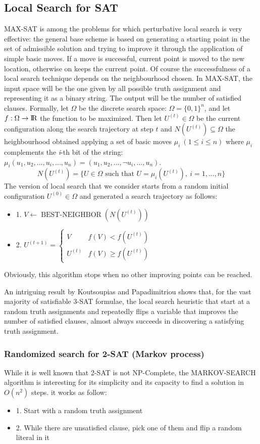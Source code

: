\documentclass[10pt]{article}
\DeclareMathOperator{\bestneighbor}{BEST-NEIGHBOR}
\begin{document}
\subsection{Local Search for SAT}
MAX-SAT is among the problems for which perturbative local search is very effective: the general base scheme is based on generating a starting point in the set of admissible solution and trying to improve it through the application of simple basic moves. If a move is successful, current point is moved to the new location, otherwise on keeps the current point. Of course the successfulness of a local search technique depends on the neighbourhood chosen. In MAX-SAT, the input space will be the one given by all possible truth assignment and representing it as a binary string. The output will be the number of satisfied clauses. Formally, let $\Omega$ be the discrete search space: $\Omega = \{0,1\}^n$, and let $f:\Omega \rightarrow  {\rm I\!R}$ the function to be maximized. Then let $U^{(t)} \in \Omega$ be the current configuration along the search trajectory at step $t$ and $N(U^{(t)}) \subseteq \Omega$ the heighbourhood obtained applying a set of basic moves $\mu_i \ (1 \leq i \leq n)$ where $\mu_i$ complements the \textit{i}-th bit of the string: $\mu_i (u_1, u_2, ... , u_i, ... ,u_n) = (u_1, u_2, ..., \lnot u_i, ..., u_n)$.
$$
N(U^{(t)}) = \{U \in \Omega \text{ such that } U = \mu_i(U^{(t)}), \ i = 1,...,n\}
$$
The version of local search that we consider starts from a random initial configuration $U^{(0)} \in \Omega$ and generated a search trajectory as follows: 
\begin{itemize}
\item{1. $V \leftarrow \bestneighbor(N(U^{(t)}))$}
\item{2. $U^{(t+1)} = \begin{cases} 
      V & f(V) < f(U^{(t)}) \\
      U^{(t)} & f(V) \geq f(U^{(t)})
   \end{cases}
$}
\end{itemize}
Obviously, this algorithm stops when no other improving points can be reached.

An intriguing result by Koutsoupias and Papadimitriou shows that, for the vast majority of satisfiable 3-SAT formulae, the local search heuristic that start at a random truth assignments and repeatedly flips a variable that improves the number of satisfied clauses, almost always succeeds in discovering a satisfying truth assignment.

\subsubsection{Randomized search for 2-SAT (Markov process)}
While it is well known that 2-SAT is not NP-Complete, the MARKOV-SEARCH algorithm is interesting for its simplicity and its capacity to find a solution in $O(n^2)$ steps. it works as follow:
\begin{itemize}
\item{1. Start with a random truth assignment}
\item{2. While there are unsatisfied clause, pick one of them and flip a random literal in it}
\end{itemize}
\end{document}
